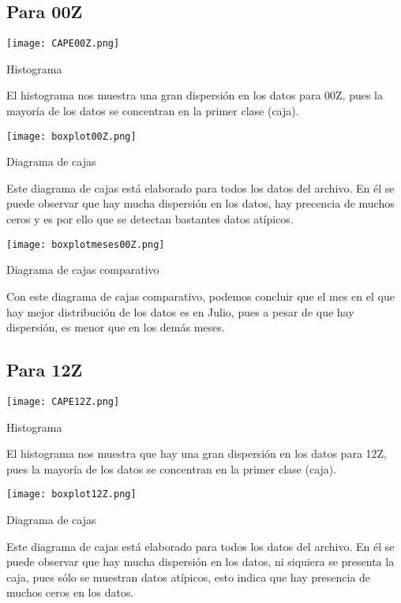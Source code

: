\documentclass[12pt]{article}
\begin{document}
\begin{doublespace}
\subsection*{Para 00Z}
\begin{center}
\texttt{[image: CAPE00Z.png]}

Histograma
\end{center}

El histograma nos muestra una gran dispersión en los datos para 00Z, pues la mayoría de los datos se concentran en la primer clase (caja).

\begin{center}
\vspace{1 cm}

\texttt{[image: boxplot00Z.png]}

Diagrama de cajas
\end{center}
Este diagrama de cajas está elaborado para todos los datos del archivo. En él se puede observar que hay mucha dispersión en los datos, hay precencia de muchos ceros y es por ello que se detectan bastantes datos atípicos.
\begin{center}
\vspace{1 cm}

\texttt{[image: boxplotmeses00Z.png]}

Diagrama de cajas comparativo
\end{center}
Con este diagrama de cajas comparativo, podemos concluir que el mes en el que hay mejor distribución de los datos es en Julio, pues a pesar de que hay dispersión, es menor que en los demás meses.

\subsection*{Para 12Z}
\begin{center}
\texttt{[image: CAPE12Z.png]}

Histograma
\end{center}

El histograma nos muestra que hay una gran dispersión en los datos para 12Z, pues la mayoría de los datos se concentran en la primer clase (caja).

\begin{center}
\vspace{1 cm}

\texttt{[image: boxplot12Z.png]}

Diagrama de cajas
\end{center}
Este diagrama de cajas está elaborado para todos los datos del archivo. En él se puede observar que hay mucha dispersión en los datos, ni siquiera se presenta la caja, pues sólo se muestran datos atípicos, esto indica que hay presencia de muchos ceros en los datos.
\begin{center}
\vspace{1 cm}


\end{center}
\end{doublespace}
\end{document}
